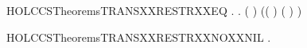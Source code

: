 \begin{SaveVerbatim}{HOLCCSTheoremsTRANSXXRESTRXXEQ}
\HOLTokenTurnstile{} \HOLSymConst{\HOLTokenForall{}}   .
       \HOLConst{\ensuremath{\nu}}   \HOLTokenTransBegin{}\HOLTokenTransEnd {} \HOLSymConst{\HOLTokenEquiv{}}
       \HOLSymConst{\HOLTokenExists{}} .
           ( \HOLSymConst{=} \HOLConst{\ensuremath{\nu}}  ) \HOLSymConst{\HOLTokenConj{}}  \HOLTokenTransBegin{}\HOLTokenTransEnd {} \HOLSymConst{\HOLTokenConj{}}
           (( \HOLSymConst{=} \HOLConst{\ensuremath{\tau}}) \HOLSymConst{\HOLTokenDisj{}} ( \HOLSymConst{=}  ) \HOLSymConst{\HOLTokenConj{}}  \HOLConst{\HOLTokenNotIn{}}  \HOLSymConst{\HOLTokenConj{}}   \HOLConst{\HOLTokenNotIn{}} )
\end{SaveVerbatim}
\newcommand{\HOLCCSTheoremsTRANSXXRESTRXXEQ}{\UseVerbatim{HOLCCSTheoremsTRANSXXRESTRXXEQ}}
\begin{SaveVerbatim}{HOLCCSTheoremsTRANSXXRESTRXXNOXXNIL}
\HOLTokenTurnstile{} \HOLSymConst{\HOLTokenForall{}}   . \HOLConst{\ensuremath{\nu}}   \HOLTokenTransBegin{}\HOLTokenTransEnd \HOLConst{\ensuremath{\nu}}   \HOLSymConst{\HOLTokenImp{}}  \HOLSymConst{\HOLTokenNotEqual{}} 
\end{SaveVerbatim}
\newcommand{\HOLCCSTheoremsTRANSXXRESTRXXNOXXNIL}{\UseVerbatim{HOLCCSTheoremsTRANSXXRESTRXXNOXXNIL}}
